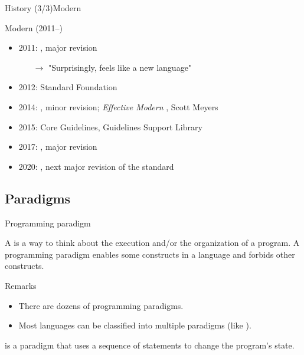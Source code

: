 \begin{frame}{\CCLang History (3/3)}{Modern \CCLang}
  \begin{block}{Modern \CCLang (2011--)}
    \begin{itemize}
    \item
      2011: , major revision
      \begin{itemize}
      \item[$\to$]
        "Surprisingly,  feels like a new language"
      \end{itemize}
    \item
      2012: Standard \CCLang Foundation
    \item
      2014: , minor revision; \emph{Effective Modern \CCLang}, Scott Meyers
    \item
      2015: \CCLang Core Guidelines, Guidelines Support Library
    \item
      2017: , major revision
    \item
      2020: , next major revision of the standard
    \end{itemize}
  \end{block}
\end{frame}

\subsection{\CCLang Paradigms}

\begin{frame}{Programming paradigm}{}
  \begin{definition}
    A  is a way to think about the execution and/or the organization of a program. A programming paradigm enables some constructs in a language and forbids other constructs.
  \end{definition}

  \begin{block}{Remarks}
    \begin{itemize}
    \item
      There are dozens of programming paradigms.
    \item
      Most languages can be classified into multiple paradigms (like \CCLang).
    \end{itemize}
  \end{block}

  \begin{example}
     is a paradigm that uses a sequence of statements to change the program's state.
  \end{example}
\end{frame}

